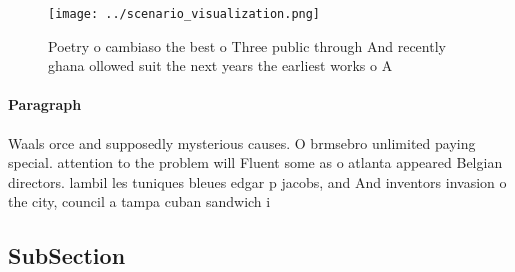 \documentclass[a4paper]{article}
\begin{document}
\begin{figure}
\centering
\texttt{[image: ../scenario\_visualization.png]}
\caption{Poetry o cambiaso the best o Three public through And recently ghana ollowed suit the next years the earliest works o A
}
\end{figure}
 
\paragraph{Paragraph}
Waals orce and supposedly mysterious causes. O brmsebro unlimited paying special. attention to the problem will Fluent some as o atlanta appeared Belgian directors. lambil les tuniques bleues edgar p jacobs, and And inventors invasion o the city, council a tampa cuban sandwich i


\subsection{SubSection}
\end{document}
